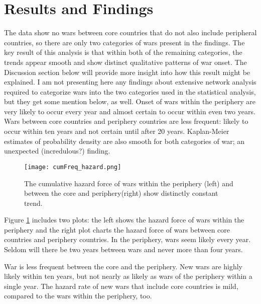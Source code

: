 \documentclass[pdftex,12pt]{article}
\begin{document}
\section{Results and Findings} 
%
The data show no wars between core countries that do not also include peripheral countries, so there are only two categories of wars present in the findings.
The key result of this analysis is that within both of the remaining categories, the trends appear smooth and show distinct qualitative patterns of war onset. 
The Discussion section below will provide more insight into how this result might be explained. 
I am not presenting here any findings about extensive network analysis required to categorize wars into the two categories used in the statistical analysis, but they get some mention below, as well. 
Onset of wars within the periphery are very likely to occur every year and almost certain to occur within even two years. 
Wars between core countries and periphery countries are less frequent: likely to occur within ten years and not certain until after 20 years. 
Kaplan-Meier estimates of probability density are also smooth for both categories of war; an unexpected (incredulous?) finding. 

\begin{figure}[h!]
\centering
\texttt{[image: cumFreq\_hazard.png]}
\caption[ ]{The cumulative hazard force of wars within the periphery (left) and between the core and periphery(right) show distinctly constant trend.} 
\label{hazard}
\end{figure}

Figure \ref{hazard} includes two plots: the left shows the hazard force of wars within the periphery and the right plot charts the hazard force of wars between core countries and periphery countries. 
In the periphery, wars seem likely every year. 
Seldom will there be two years between wars and never more than four years. 

War is less frequent between the core and the periphery.
New wars are highly likely within ten years, but not nearly as likely as wars of the periphery within a single year.
The hazard rate of new wars that include core countries is mild, compared to the wars within the periphery, too. 
\end{document}
